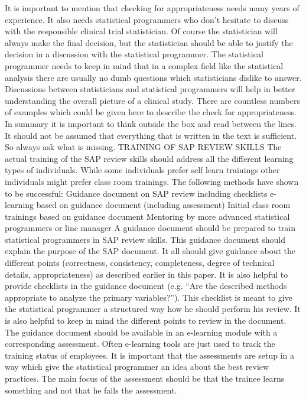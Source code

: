 It is important to mention that checking for appropriateness needs many years of experience. It also needs statistical programmers who don’t hesitate to discuss with the responsible clinical trial statistician. Of course the statistician will always make the final decision, but the statistician should be able to justify the decision in a discussion with the statistical programmer. The statistical programmer needs to keep in mind that in a complex field like the statistical analysis there are usually no dumb questions which statisticians dislike to answer. Discussions between statisticians and statistical programmers will help in better understanding the overall picture of a clinical study. There are countless numbers of examples which could be given here to describe the check for appropriateness. In summary it is important to think outside the box and read between the lines. It should not be assumed that everything that is written in the text is sufficient. So always ask what is missing.
TRAINING OF SAP REVIEW SKILLS
The actual training of the SAP review skills should address all the different learning types of individuals. While some individuals prefer self learn trainings other individuals might prefer class room trainings. The following methods have shown to be successful:
Guidance document on SAP review including checklists
e-learning based on guidance document (including assessment)
Initial class room trainings based on guidance document
Mentoring by more advanced statistical programmers or line manager
A guidance document should be prepared to train statistical programmers in SAP review skills. This guidance document should explain the purpose of the SAP document. It all should give guidance about the different points (correctness, consistency, completeness, degree of technical details, appropriateness) as described earlier in this paper.
It is also helpful to provide checklists in the guidance document (e.g. “Are the described methods appropriate to analyze the primary variables?”). This checklist is meant to give the statistical programmer a structured way how he should perform his review. It is also helpful to keep in mind the different points to review in the document.
The guidance document should be available in an e-learning module with a corresponding assessment. Often e-learning tools are just used to track the training status of employees. It is important that the assessments are setup in a way which give the statistical programmer an idea about the best review practices. The main focus of the assessment should be that the trainee learns something and not that he fails the assessment.

